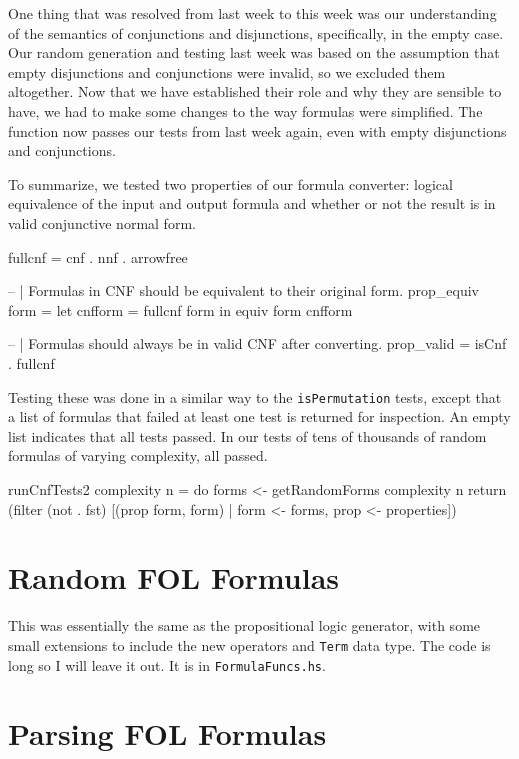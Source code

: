 \documentclass[a4paper,10pt]{article}
\numberwithin{equation}{section}%
\begin{document}
One thing that was resolved from last week to this week was our understanding of the semantics of conjunctions and disjunctions, specifically, in the empty case. Our random generation and testing last week was based on the assumption that empty disjunctions and conjunctions were invalid, so we excluded them altogether. Now that we have established their role and why they are sensible to have, we had to make some changes to the way formulas were simplified. The function now passes our tests from last week again, even with empty disjunctions and conjunctions.

To summarize, we tested two properties of our formula converter: logical equivalence of the input and output formula and whether or not the result is in valid conjunctive normal form.

\begin{code}
fullcnf = cnf . nnf . arrowfree

-- | Formulas in CNF should be equivalent to their original form.
prop_equiv form = let cnfform = fullcnf form
                  in equiv form cnfform

-- | Formulas should always be in valid CNF after converting.
prop_valid = isCnf . fullcnf
\end{code}

Testing these was done in a similar way to the \texttt{isPermutation} tests, except that a list of formulas that failed at least one test is returned for inspection. An empty list indicates that all tests passed. In our tests of tens of thousands of random formulas of varying complexity, all passed.
\begin{code}
runCnfTests2 complexity n  = do
    forms <- getRandomForms complexity n
    return (filter (not . fst) [(prop form, form) | form <- forms, prop <- properties])
\end{code}

\section{Random FOL Formulas}

This was essentially the same as the propositional logic generator, with some small extensions to include the new operators and \texttt{Term} data type. The code is long so I will leave it out. It is in \texttt{FormulaFuncs.hs}.

\section{Parsing FOL Formulas}
\end{document}
